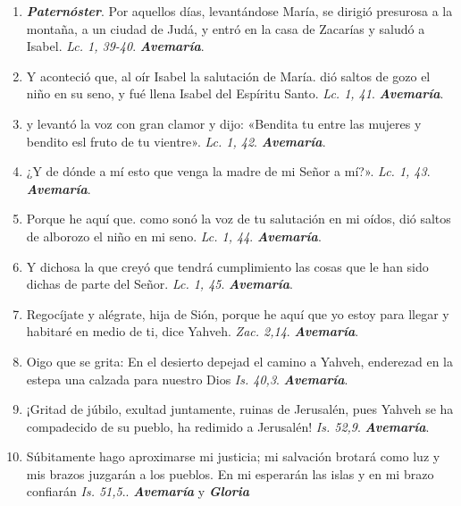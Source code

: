 \documentclass[./rosary.tex]{subfiles}
\begin{document}
\begin{enumerate}
      \item \textbf{\emph{Paternóster}}. Por aquellos días, levantándose María, se dirigió presurosa a la montaña, a un ciudad de Judá, y entró en la casa de Zacarías y saludó a Isabel. \emph{Lc. 1, 39-40}. \textbf{\emph{Avemaría}}.

      \item Y aconteció que, al oír Isabel la salutación de María. dió saltos de gozo el niño en su seno, y fué llena Isabel del Espíritu Santo. \emph{Lc. 1, 41}. \textbf{\emph{Avemaría}}.

      \item y levantó la voz con gran clamor y dijo: «Bendita tu entre las mujeres y bendito esl fruto de tu vientre». \emph{Lc. 1, 42}. \textbf{\emph{Avemaría}}.

      \item ¿Y de dónde a mí esto que venga la madre de mi Señor a mí?». \emph{Lc. 1, 43}. \textbf{\emph{Avemaría}}.

      \item Porque he aquí que. como sonó la voz de tu salutación en mi oídos, dió saltos de alborozo el niño en mi seno. \emph{Lc. 1, 44}. \textbf{\emph{Avemaría}}.

      \item Y dichosa la que creyó que tendrá cumplimiento las cosas que le han sido dichas de parte del Señor. \emph{Lc. 1, 45}. \textbf{\emph{Avemaría}}.

      \item Regocíjate y alégrate, hija de Sión, porque he aquí que yo estoy para llegar y habitaré en medio de ti, dice Yahveh. \emph{Zac. 2,14}. \textbf{\emph{Avemaría}}.

      \item Oigo que se grita: En el desierto depejad el camino a Yahveh, enderezad en la estepa una calzada para nuestro Dios \emph{Is. 40,3}. \textbf{\emph{Avemaría}}.

      \item ¡Gritad de júbilo, exultad juntamente, ruinas de Jerusalén, pues Yahveh se ha compadecido de su pueblo, ha redimido a Jerusalén! \emph{Is. 52,9}. \textbf{\emph{Avemaría}}.

      \item Súbitamente hago aproximarse mi justicia; mi salvación brotará como luz y mis brazos juzgarán a los pueblos. En mi esperarán las islas y en mi brazo confiarán \emph{Is. 51,5}.. \textbf{\emph{Avemaría}} y \textbf{\emph{Gloria}}
\end{enumerate}
\end{document}

